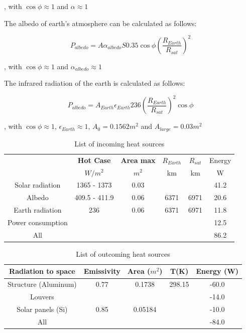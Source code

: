 , with $\cos{\phi} \approx 1$ and $\alpha \approx 1$

The albedo of earth’s atmosphere can be calculated as follows:

\begin{equation}
	P_{albedo} = A \alpha_{albedo} S 0.35 \cos{\phi} \left(\frac{R_{Earth}}{R_{sat}} \right)^2
\end{equation}

, with $\cos{\phi} \approx 1$ and $\alpha_{albedo} \approx 1$

The infrared radiation of the earth is calculated as follows:

\begin{equation}
	P_{albedo} = A_{Earth} \epsilon_{Earth} 236 \left(\frac{R_{Earth}}{R_{sat}} \right)^2 \cos{\phi}
\end{equation}

, with $\cos{\phi} \approx 1$, $\epsilon_{Earth} \approx 1$, $A_0 = 0.1562m^2$ and $A_{large} = 0.03m^2$

\begin{table}[h!]
	\centering
	\begin{tabular}{c c c c c c}
		\hline
		& \textbf{Hot Case} & \textbf{Area max} & $R_{Earth}$ & $R_{sat}$ & Energy \\
		& $W/m^2$ & $m^2$ & km & km & W \\ \hline
		Solar radiation & 1365 - 1373 & 0.03 & & & 41.2 \\ \hline
		Albedo & 409.5 - 411.9 & 0.06 & 6371 & 6971 & 20.6 \\ \hline
		Earth radiation & 236 & 0.06 & 6371 & 6971 & 11.8 \\ \hline
		Power consumption & & & & & 12.5 \\ \hline
		All & & & & & 86.2 \\ \hline
	\end{tabular}
	\caption{List of incoming heat sources}
	\label{tab:incomeing_heat}
\end{table}

\begin{table}[h!]
	\centering
	\begin{tabular}{c c c c c}
		\hline
		\textbf{Radiation to space} & \textbf{Emissivity} & Area ($m^2$) & T(K) & Energy (W) \\ \hline
		Structure (Aluminum) & 0.77 & 0.1738 & 298.15 & -60.0 \\ \hline
		Louvers & & & & -14.0 \\ \hline
		Solar panels (Si) & 0.85 & 0.05184 & & -10.0 \\ \hline
		All & & & & -84.0 \\ \hline
	\end{tabular}
	\caption{List of outcoming heat sources}
	\label{tab:heat_outcome}
\end{table}

